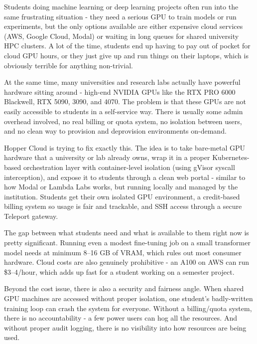 \documentclass[12pt,a4paper]{article}
\newcommand{\subsubhead}[1]{\vspace{0.4em}{\color{hoppergray}\normalsize\bfseries\itshape #1}\par\vspace{0.2em}}
\begin{document}
\subsubhead{What Problem Are We Solving?}

Students doing machine learning or deep learning projects often run into the same frustrating situation - they need a serious GPU to train models or run experiments, but the only options available are either expensive cloud services (AWS, Google Cloud, Modal) or waiting in long queues for shared university HPC clusters. A lot of the time, students end up having to pay out of pocket for cloud GPU hours, or they just give up and run things on their laptops, which is obviously terrible for anything non-trivial.

At the same time, many universities and research labs actually have powerful hardware sitting around - high-end NVIDIA GPUs like the RTX PRO 6000 Blackwell, RTX 5090, 3090, and 4070. The problem is that these GPUs are not easily accessible to students in a self-service way. There is usually some admin overhead involved, no real billing or quota system, no isolation between users, and no clean way to provision and deprovision environments on-demand.

Hopper Cloud is trying to fix exactly this. The idea is to take bare-metal GPU hardware that a university or lab already owns, wrap it in a proper Kubernetes-based orchestration layer with container-level isolation (using gVisor syscall interception), and expose it to students through a clean web portal - similar to how Modal or Lambda Labs works, but running locally and managed by the institution. Students get their own isolated GPU environment, a credit-based billing system so usage is fair and trackable, and SSH access through a secure Teleport gateway.

\subsubhead{Why Does It Matter?}

The gap between what students need and what is available to them right now is pretty significant. Running even a modest fine-tuning job on a small transformer model needs at minimum 8--16 GB of VRAM, which rules out most consumer hardware. Cloud costs are also genuinely prohibitive - an A100 on AWS can run \$3--4/hour, which adds up fast for a student working on a semester project.

Beyond the cost issue, there is also a security and fairness angle. When shared GPU machines are accessed without proper isolation, one student's badly-written training loop can crash the system for everyone. Without a billing/quota system, there is no accountability - a few power users can hog all the resources. And without proper audit logging, there is no visibility into how resources are being used.
\end{document}
